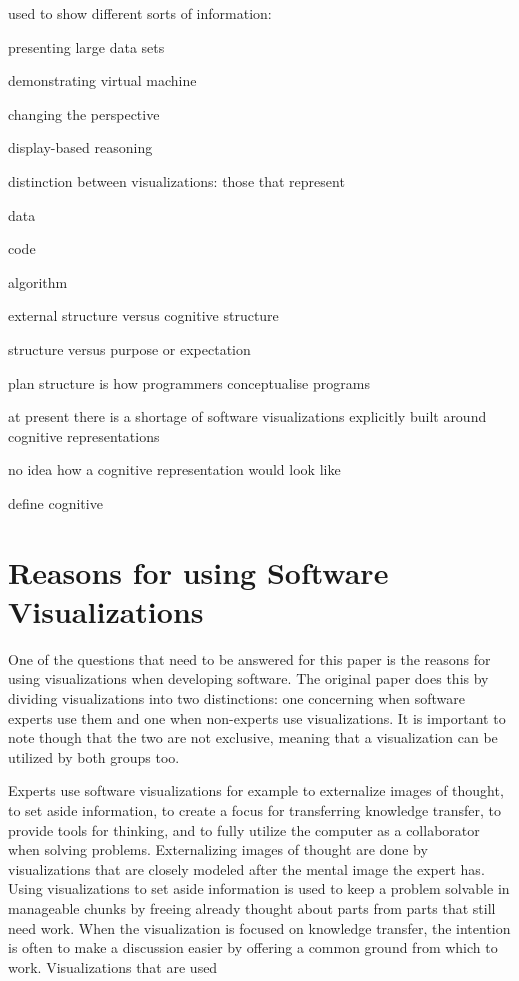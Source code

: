 \documentclass[11pt, a4paper, ngerman, twoside]{article}
\theoremstyle{plain}\newtheorem{Lemma}{Lemma}
\theoremstyle{plain}\newtheorem{Satz}[Lemma]{Satz}
\theoremstyle{definition}\newtheorem{Definition}[Lemma]{Definition}
\theoremstyle{definition}\newtheorem*{Beispiel}{Beispiel}
\theoremstyle{remark}\newtheorem*{Bemerkung}{Bemerkung}
\begin{document}
used to show different sorts of information:

presenting large data sets

demonstrating virtual machine

changing the perspective

display-based reasoning

distinction between visualizations: those that represent

data

code

algorithm

external structure versus cognitive structure

structure versus purpose or expectation

plan structure is how programmers conceptualise programs

at present there is a shortage of software visualizations explicitly built around cognitive representations

no idea how a cognitive representation would look like

define cognitive

\section{Reasons for using Software Visualizations}

One of the questions that need to be answered for this paper is the reasons for using visualizations when developing software. The original paper does this by dividing visualizations into two distinctions: one concerning when software experts use them and one when non-experts use visualizations. It is important to note though that the two are not exclusive, meaning that a visualization can be utilized by both groups too.

Experts use software visualizations for example to externalize images of thought, to set aside information, to create a focus for transferring knowledge transfer, to provide tools for thinking, and to fully utilize the computer as a collaborator when solving problems. Externalizing images of thought are done by visualizations that are closely modeled after the mental image the expert has. Using visualizations to set aside information is used to keep a problem solvable in manageable chunks by freeing already thought about parts from parts that still need work. When the visualization is focused on knowledge transfer, the intention is often to make a discussion easier by offering a common ground from which to work. Visualizations that are used 
\end{document}
